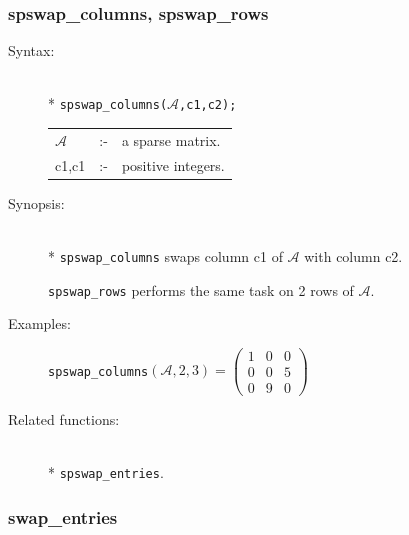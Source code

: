 \subsubsection{spswap\_columns, spswap\_rows}
\label{sparse:spswap_columns}
\hypertarget{operator:SPSWAP_COLUMNS}{}

\begin{description}
\item[Syntax:]\mbox{}\\*
{\tt spswap\_columns($\mathcal{A}$,c1,c2);}\\[2mm]
\begin{tabular}{l l l}
$\mathcal{A}$ &:-& a sparse matrix. \\
c1,c1      &:-& positive integers.
\end{tabular}

\item[Synopsis:]\mbox{}\\*
\texttt{spswap\_columns} swaps column c1 of $\mathcal{A}$ with column c2.

\texttt{spswap\_rows} performs the same task on 2 rows of
                $\mathcal{A}$.

\item[Examples:]
\texttt{spswap\_columns}\((\mathcal{A},2,3) =
        \begin{pmatrix} 1 & 0 & 0 \\ 0 & 0 & 5 \\ 0 & 9 & 0 \end{pmatrix}\)

\item[Related functions:]\mbox{}\\*
\texttt{spswap\_entries}.
\end{description}

\subsubsection{swap\_entries}
\label{sparse:spadd_entries}
\hypertarget{operator:SPSWAP_ENTRIES}{}

